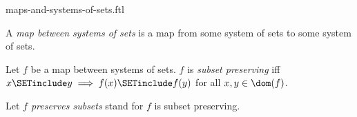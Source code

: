 \documentclass{naproche-library}
\begin{document}
\begin{smodule}[title=Maps and Systems of Sets]{maps-and-systems-of-sets.ftl}

\begin{definition}[forthel,id=FOUNDATIONS_10_1394550966845440]
  A \emph{map between systems of sets} is a map from some system of sets to some system of sets.
\end{definition}

\begin{definition}[forthel,id=FOUNDATIONS_10_3290499861446656]
  Let $f$ be a map between systems of sets.
  $f$ is \emph{subset preserving} iff $x \SETinclude y \implies f(x) \SETinclude f(y)$ for all $x, y \in \dom(f)$.

  Let \emph{$f$ preserves subsets} stand for $f$ is subset preserving.
\end{definition}
\end{smodule}
\end{document}
